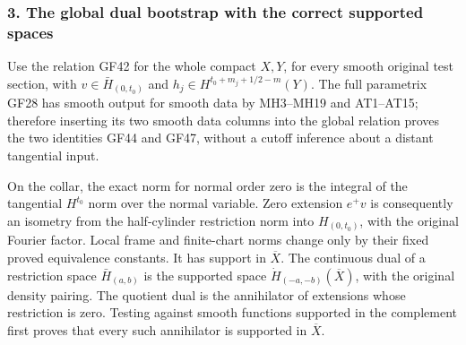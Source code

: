 \documentclass[
  11pt,
]{article}
\makeatletter
\let\ReaderOriginalAnchorStart\hyper@anchorstart
\let\ReaderOriginalAnchorEnd\hyper@anchorend
\let\ReaderPendingAliases\@empty
\def\ReaderArmAliases#1{\gdef\ReaderPendingAliases{#1}}
\def\hyper@anchorstart#1{\ReaderIfNativeAnchorTF{#1}{\ReaderPendingAliases\global\let\ReaderPendingAliases\@empty}{}\ReaderOriginalAnchorStart{#1}}
\makeatother
\begin{document}
\ReaderArmAliases{\ReaderOriginalAnchorStart{AN03-GCF-FOUNDATION-028}\ReaderOriginalAnchorEnd\begingroup\expandafter\def\csname @currentHref\endcsname{AN03-GCF-FOUNDATION-028}\label{AN03-GCF-FOUNDATION-028}\endgroup\ReaderOriginalAnchorStart{pc-global-dual}\ReaderOriginalAnchorEnd}
\subsubsection{3. The global dual bootstrap with the correct supported
spaces}\label{pc-global-dual}

Use the relation GF42 for the whole compact \(X,Y\), for every smooth
original test section, with \(v\in\bar H_{(0,t_0)}\) and
\(h_j\in H^{t_0+m_j+1/2-m}(Y)\). The full parametrix GF28 has smooth
output for smooth data by MH3--MH19 and AT1--AT15; therefore inserting
its two smooth data columns into the global relation proves the two
identities GF44 and GF47, without a cutoff inference about a distant
tangential input.

On the collar, the exact norm for normal order zero is the integral of
the tangential \(H^{t_0}\) norm over the normal variable. Zero extension
\(e^+v\) is consequently an isometry from the half-cylinder restriction
norm into \(H_{(0,t_0)}\), with the original Fourier factor. Local frame
and finite-chart norms change only by their fixed proved equivalence
constants. It has support in \(\overline X\). The continuous dual of a
restriction space \(\bar H_{(a,b)}\) is the supported space
\(\dot H_{(-a,-b)}(\overline X)\), with the original density pairing.
The quotient dual is the annihilator of extensions whose restriction is
zero. Testing against smooth functions supported in the complement first
proves that every such annihilator is supported in \(\overline X\).
\end{document}
